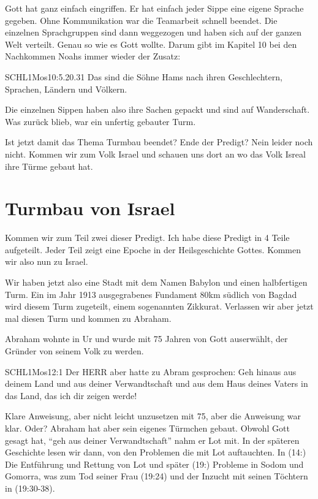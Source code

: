 \documentclass[14pt]{../../inc/mybib}
\newenvironment{block}[1][]{%
  \vspace{1.5em}%
  \noindent\textbf{#1}\par%
  \vspace{0.0em}%
}{%
  \vspace{1em}%
}
\begin{document}
\begin{block}
    Gott hat ganz einfach eingriffen. Er hat einfach jeder Sippe eine eigene Sprache gegeben. Ohne Kommunikation war die Teamarbeit schnell beendet. Die einzelnen Sprachgruppen sind dann weggezogen und haben sich auf der ganzen Welt verteilt. Genau so wie es Gott wollte.
    Darum gibt im Kapitel 10 bei den Nachkommen Noahs immer wieder der Zusatz:
    \begin{bibelbox}{SCHL}{1Mos}{10:5.20.31}
        Das sind die Söhne Hams nach ihren Geschlechtern, Sprachen, Ländern und Völkern.
    \end{bibelbox}    
    
    Die einzelnen Sippen haben also ihre Sachen gepackt und sind auf Wanderschaft. Was zurück blieb, war ein unfertig gebauter Turm.
\end{block}
\begin{block}
    Ist jetzt damit das Thema Turmbau beendet? Ende der Predigt? Nein leider noch nicht. Kommen wir zum Volk Israel und schauen uns dort an wo das Volk Isreal ihre Türme gebaut hat.
    
    \section{Turmbau von Israel}
    Kommen wir zum Teil zwei dieser Predigt. Ich habe diese Predigt in 4 Teile aufgeteilt. Jeder Teil zeigt eine Epoche in der Heilsgeschichte Gottes. Kommen wir also nun zu Israel.
\end{block}
\begin{block}
    Wir haben jetzt also eine Stadt mit dem Namen Babylon und einen halbfertigen Turm. Ein im Jahr 1913 ausgegrabenes Fundament 80km südlich von Bagdad wird diesem Turm zugeteilt, einem sogenannten Zikkurat. Verlassen wir aber jetzt mal diesen Turm und kommen zu Abraham.
\end{block}
\begin{block}
    Abraham wohnte in Ur und wurde mit 75 Jahren von Gott auserwählt, der Gründer von seinem Volk zu werden. 
    \begin{bibelbox}{SCHL}{1Mos}{12:1}
        Der HERR aber hatte zu Abram gesprochen: Geh hinaus aus deinem Land und aus deiner Verwandtschaft und aus dem Haus deines Vaters in das Land, das ich dir zeigen werde!
    \end{bibelbox} 

    Klare Anweisung, aber nicht leicht unzusetzen mit 75, aber die Anweisung war klar. Oder? Abraham hat aber sein eigenes Türmchen gebaut. Obwohl Gott gesagt hat, \enquote{geh aus deiner Verwandtschaft} nahm er Lot mit. In der späteren Geschichte lesen wir dann, von den Problemen die mit Lot auftauchten. In (14:) Die Entführung und Rettung von Lot und später (19:) Probleme in Sodom und Gomorra, was zum Tod seiner Frau (19:24) und der Inzucht mit seinen Töchtern in (19:30-38).
\end{block}
\end{document}
